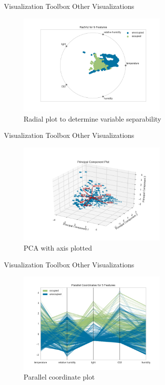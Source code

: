 \documentclass[10pt]{beamer}
\begin{document}
\begin{frame}{Visualization Toolbox}
Other Visualizations
	\begin{figure}	
		\caption{Radial plot to determine variable separability}
		\includegraphics[width=0.65\textwidth, center, trim=0cm 0cm 0 0cm]{images/radviz.png}
	\end{figure}
\end{frame}

\begin{frame}{Visualization Toolbox}
Other Visualizations
	\begin{figure}	
		\caption{PCA with axis plotted}
		\includegraphics[width=0.65\textwidth, center, trim=0cm 0cm 0 0cm]{images/pca_biplot_3d.png}
	\end{figure}
\end{frame}

\begin{frame}{Visualization Toolbox}
Other Visualizations
	\begin{figure}	
		\caption{Parallel coordinate plot}
		\includegraphics[width=0.65\textwidth, center, trim=0cm 0cm 0 0cm]{images/normalized_sampled_parallel_coordinates.png}
	\end{figure}
\end{frame}
\end{document}
